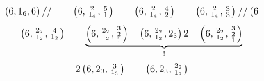 \[
\left(6,1_6,6\right)\mathbin{//}\qquad \left(6,\begin{smallmatrix}2\\1_4\end{smallmatrix},\begin{smallmatrix}5\\1\end{smallmatrix}\right)\qquad \left(6,\begin{smallmatrix}2\\1_4\end{smallmatrix},\begin{smallmatrix}4\\2\end{smallmatrix}\right)\qquad \left(6,\begin{smallmatrix}2\\1_4\end{smallmatrix},\begin{smallmatrix}3\\3\end{smallmatrix}\right)\mathbin{//}(6
\]
\[
\left(6,\begin{smallmatrix}2_2\\1_2\end{smallmatrix},\begin{smallmatrix}4\\1_2\end{smallmatrix}\right)\qquad \underbrace{\left(6,\begin{smallmatrix}2_2\\1_2\end{smallmatrix},\begin{smallmatrix}3\\2\\1\end{smallmatrix}\right)\quad\left(6,\begin{smallmatrix}2_2\\1_2\end{smallmatrix},2_3\right)2\quad\left(6,\begin{smallmatrix}2_2\\1_2\end{smallmatrix},\begin{smallmatrix}3\\2\\1\end{smallmatrix}\right)}_{!}
\]
\[
2\left(6,2_3,\begin{smallmatrix}3\\1_3\end{smallmatrix}\right)\qquad \left(6,2_3,\begin{smallmatrix}2_2\\1_2\end{smallmatrix}\right)
\]
